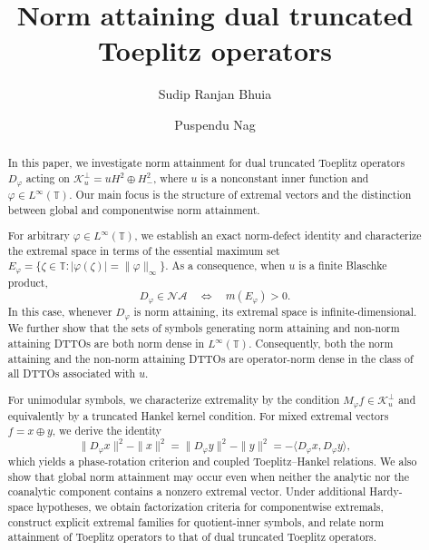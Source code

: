 \documentclass[12pt]{amsart}
\theoremstyle{definition}
\theoremstyle{remark}
\def \T{\mathbb{T}}
\newcommand{\clk}{\mathcal{K}}
\newcommand{\vp}{\varphi}
\numberwithin{equation}{section}
\begin{document}
\title[Norm attaining dual truncated Toeplitz operators]{Norm attaining dual truncated Toeplitz operators}
\author{Sudip Ranjan Bhuia}
\address{Department of Mathematics, Shiv Nadar University, NH91, Tehsil Dadri, Greater Noida, Gautam Buddha Nagar, Uttar Pradesh-201314, India}

\author{Puspendu Nag}
\address{Department of Mathematics, IIT Hyderabad, 
Kandi, Sangareddy, Telangana, India, 502\,284}





\begin{abstract}
In this paper, we investigate norm attainment for dual truncated Toeplitz operators $D_\vp$ acting on $\clk_u^\perp=uH^2\oplus H^2_{-}$, where $u$ is a nonconstant inner function and $\vp\in L^\infty(\T)$. Our main focus is the structure of extremal vectors and the distinction between global and componentwise norm attainment.
	
For arbitrary $\vp\in L^\infty(\T)$, we establish an exact norm-defect identity and characterize the extremal space in terms of the essential maximum set $E_\vp=\{\zeta\in\T:|\vp(\zeta)|=\|\vp\|_\infty\}$. As a consequence, when $u$ is a finite Blaschke product,
\[
D_\vp\in\mathcal{NA}\quad\Longleftrightarrow\quad
m(E_\vp)>0.
\]
In this case, whenever $D_\vp$ is norm attaining, its extremal space is infinite-dimensional. We further show that the sets of symbols generating norm attaining and non-norm attaining DTTOs are both norm dense in $L^\infty(\T)$. Consequently, both the norm attaining and the non-norm attaining DTTOs are operator-norm dense in the class of all DTTOs associated with $u$.
	
For unimodular symbols, we characterize extremality by the condition
$M_\vp f\in\clk_u^\perp$ and equivalently by a truncated Hankel kernel condition. For mixed extremal vectors $f=x\oplus y$, we derive the identity
\[
\|D_\vp x\|^2-\|x\|^2=\|D_\vp y\|^2-\|y\|^2=-\langle D_\vp x,D_\vp y\rangle,
\]
which yields a phase-rotation criterion and coupled
Toeplitz--Hankel relations. We also show that global norm attainment
may occur even when neither the analytic nor the coanalytic component
contains a nonzero extremal vector. Under additional Hardy-space
hypotheses, we obtain factorization criteria for componentwise extremals, construct explicit extremal families for quotient-inner
symbols, and relate norm attainment of Toeplitz operators to that of
dual truncated Toeplitz operators.
\end{abstract}
\end{document}
